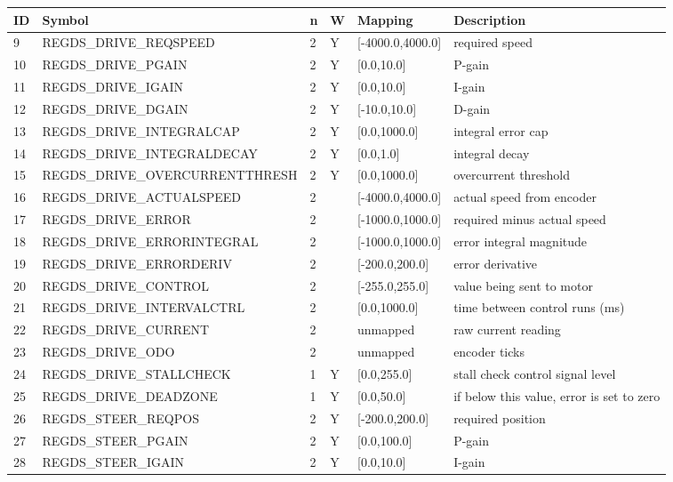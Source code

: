 \begin{tabular}{|p{0.2in}|p{2.7in}|p{0.1in}|p{0.1in}|p{1in}|p{1.5in}|}\hline
\textbf{ID} & \textbf{Symbol} & \textbf{n} & \textbf{W} & \textbf{Mapping} & \textbf{Description}  \\ \hline 
9 & REGDS\_DRIVE\_REQSPEED & 2 & Y & [-4000.0,4000.0] & required speed\\ \hline
10 & REGDS\_DRIVE\_PGAIN & 2 & Y & [0.0,10.0] & P-gain\\ \hline
11 & REGDS\_DRIVE\_IGAIN & 2 & Y & [0.0,10.0] & I-gain\\ \hline
12 & REGDS\_DRIVE\_DGAIN & 2 & Y & [-10.0,10.0] & D-gain\\ \hline
13 & REGDS\_DRIVE\_INTEGRALCAP & 2 & Y & [0.0,1000.0] & integral error cap\\ \hline
14 & REGDS\_DRIVE\_INTEGRALDECAY & 2 & Y & [0.0,1.0] & integral decay\\ \hline
15 & REGDS\_DRIVE\_OVERCURRENTTHRESH & 2 & Y & [0.0,1000.0] & overcurrent threshold\\ \hline
16 & REGDS\_DRIVE\_ACTUALSPEED & 2 &  & [-4000.0,4000.0] & actual speed from encoder\\ \hline
17 & REGDS\_DRIVE\_ERROR & 2 &  & [-1000.0,1000.0] & required minus actual speed\\ \hline
18 & REGDS\_DRIVE\_ERRORINTEGRAL & 2 &  & [-1000.0,1000.0] & error integral magnitude\\ \hline
19 & REGDS\_DRIVE\_ERRORDERIV & 2 &  & [-200.0,200.0] & error derivative\\ \hline
20 & REGDS\_DRIVE\_CONTROL & 2 &  & [-255.0,255.0] & value being sent to motor\\ \hline
21 & REGDS\_DRIVE\_INTERVALCTRL & 2 &  & [0.0,1000.0] & time between control runs (ms)\\ \hline
22 & REGDS\_DRIVE\_CURRENT & 2 &  & unmapped & raw current reading\\ \hline
23 & REGDS\_DRIVE\_ODO & 2 &  & unmapped & encoder ticks\\ \hline
24 & REGDS\_DRIVE\_STALLCHECK & 1 & Y & [0.0,255.0] & stall check control signal level\\ \hline
25 & REGDS\_DRIVE\_DEADZONE & 1 & Y & [0.0,50.0] & if below this value, error is set to zero\\ \hline
26 & REGDS\_STEER\_REQPOS & 2 & Y & [-200.0,200.0] & required position\\ \hline
27 & REGDS\_STEER\_PGAIN & 2 & Y & [0.0,100.0] & P-gain\\ \hline
28 & REGDS\_STEER\_IGAIN & 2 & Y & [0.0,10.0] & I-gain\\ \hline

\end{tabular}
